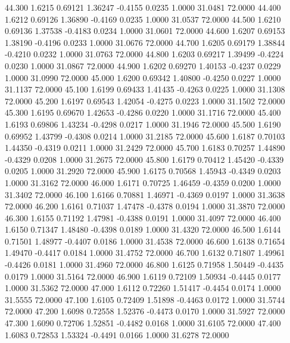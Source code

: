   44.300   1.6215   0.69121   1.36247  -0.4155   0.0235   1.0000  31.0481  72.0000
  44.400   1.6212   0.69126   1.36890  -0.4169   0.0235   1.0000  31.0537  72.0000
  44.500   1.6210   0.69136   1.37538  -0.4183   0.0234   1.0000  31.0601  72.0000
  44.600   1.6207   0.69153   1.38190  -0.4196   0.0233   1.0000  31.0676  72.0000
  44.700   1.6205   0.69179   1.38844  -0.4210   0.0232   1.0000  31.0763  72.0000
  44.800   1.6203   0.69217   1.39499  -0.4224   0.0230   1.0000  31.0867  72.0000
  44.900   1.6202   0.69270   1.40153  -0.4237   0.0229   1.0000  31.0990  72.0000
  45.000   1.6200   0.69342   1.40800  -0.4250   0.0227   1.0000  31.1137  72.0000
  45.100   1.6199   0.69433   1.41435  -0.4263   0.0225   1.0000  31.1308  72.0000
  45.200   1.6197   0.69543   1.42054  -0.4275   0.0223   1.0000  31.1502  72.0000
  45.300   1.6195   0.69670   1.42653  -0.4286   0.0220   1.0000  31.1716  72.0000
  45.400   1.6193   0.69806   1.43234  -0.4298   0.0217   1.0000  31.1946  72.0000
  45.500   1.6190   0.69952   1.43799  -0.4308   0.0214   1.0000  31.2185  72.0000
  45.600   1.6187   0.70103   1.44350  -0.4319   0.0211   1.0000  31.2429  72.0000
  45.700   1.6183   0.70257   1.44890  -0.4329   0.0208   1.0000  31.2675  72.0000
  45.800   1.6179   0.70412   1.45420  -0.4339   0.0205   1.0000  31.2920  72.0000
  45.900   1.6175   0.70568   1.45943  -0.4349   0.0203   1.0000  31.3162  72.0000
  46.000   1.6171   0.70725   1.46459  -0.4359   0.0200   1.0000  31.3402  72.0000
  46.100   1.6166   0.70881   1.46971  -0.4369   0.0197   1.0000  31.3638  72.0000
  46.200   1.6161   0.71037   1.47478  -0.4378   0.0194   1.0000  31.3870  72.0000
  46.300   1.6155   0.71192   1.47981  -0.4388   0.0191   1.0000  31.4097  72.0000
  46.400   1.6150   0.71347   1.48480  -0.4398   0.0189   1.0000  31.4320  72.0000
  46.500   1.6144   0.71501   1.48977  -0.4407   0.0186   1.0000  31.4538  72.0000
  46.600   1.6138   0.71654   1.49470  -0.4417   0.0184   1.0000  31.4752  72.0000
  46.700   1.6132   0.71807   1.49961  -0.4426   0.0181   1.0000  31.4960  72.0000
  46.800   1.6125   0.71958   1.50449  -0.4435   0.0179   1.0000  31.5164  72.0000
  46.900   1.6119   0.72109   1.50934  -0.4445   0.0177   1.0000  31.5362  72.0000
  47.000   1.6112   0.72260   1.51417  -0.4454   0.0174   1.0000  31.5555  72.0000
  47.100   1.6105   0.72409   1.51898  -0.4463   0.0172   1.0000  31.5744  72.0000
  47.200   1.6098   0.72558   1.52376  -0.4473   0.0170   1.0000  31.5927  72.0000
  47.300   1.6090   0.72706   1.52851  -0.4482   0.0168   1.0000  31.6105  72.0000
  47.400   1.6083   0.72853   1.53324  -0.4491   0.0166   1.0000  31.6278  72.0000
